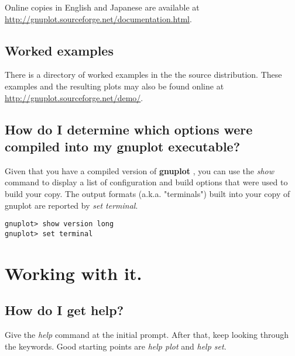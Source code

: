 \documentclass[a4paper,11pt]{article}
\def\http#1{{\small\href{http://#1}{\url{http://#1}}}}
\newcommand{\http}[1]%
            {\htmladdnormallink{\latex{\url{http://#1}}%
                    \html{\textit{http://#1}}}%
                {http://#1}%
            }
\newcommand{\gnuplot}{\textbf{gnuplot }}
\begin{document}
Online copies in English and Japanese are available at
\http{gnuplot.sourceforge.net/documentation.html}.

\subsection{Worked examples}

There is a directory of worked examples in the the source distribution.
These examples and the resulting plots may also be found online at
\http{gnuplot.sourceforge.net/demo/}.


\subsection{How do I determine which options were compiled into my \gnuplot executable?}

Given that you have a compiled version of \gnuplot, you can use the
{\em show} command to display a list of configuration and build options
that were used to build your copy.  The output formats (a.k.a. "terminals")
built into your copy of gnuplot are reported by {\em set terminal}.

\small
\begin{verbatim}
gnuplot> show version long
gnuplot> set terminal
\end{verbatim}
\normalsize


\section{Working with it.}

\subsection{How do I get help?}

Give the {\em help} command at the initial prompt. After that, keep
looking through the keywords. Good starting points are {\em help plot}
and {\em help set}.
\end{document}
